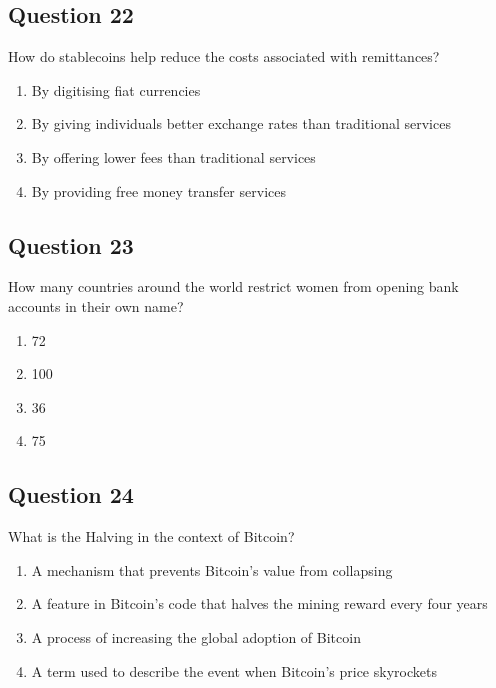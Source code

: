 \documentclass[12pt,a4paper]{article}
\begin{document}
\bigskip


\subsection*{Question 22}
How do stablecoins help reduce the costs associated with remittances?

\begin{enumerate}[label=\Alph*., leftmargin=*]
\item By digitising fiat currencies
\item By giving individuals better exchange rates than traditional services
\item By offering lower fees than traditional services
\item By providing free money transfer services
\end{enumerate}

\bigskip


\subsection*{Question 23}
How many countries around the world restrict women from opening bank accounts in their own name?

\begin{enumerate}[label=\Alph*., leftmargin=*]
\item 72
\item 100
\item 36
\item 75
\end{enumerate}

\bigskip


\subsection*{Question 24}
What is the Halving in the context of Bitcoin?

\begin{enumerate}[label=\Alph*., leftmargin=*]
\item A mechanism that prevents Bitcoin's value from collapsing
\item A feature in Bitcoin's code that halves the mining reward every four years
\item A process of increasing the global adoption of Bitcoin
\item A term used to describe the event when Bitcoin’s price skyrockets
\end{enumerate}
\end{document}
